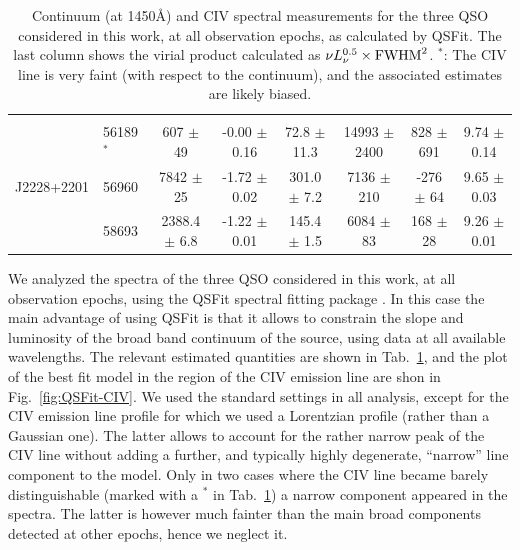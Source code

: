 \documentclass{article}
\begin{document}
\begin{table}
\begin{centering}
\begin{tabular}{l | l | c c | c c c | c}
                                      &                        &                                     &                          &                    &                     &                  \\
                       &  56189$^*$   &    607   $\pm$ 49      &  -0.00 $\pm$ 0.16                   &   72.8  $\pm$ 11.3       &  14993 $\pm$ 2400  &     828 $\pm$ 691   &   9.74 $\pm$ 0.14\\  
          J2228+2201   &  56960       &   7842   $\pm$ 25      &  -1.72 $\pm$ 0.02                   &  301.0  $\pm$  7.2       &   7136 $\pm$  210  &    -276 $\pm$  64   &   9.65 $\pm$ 0.03\\ 
                       &  58693       &   2388.4 $\pm$  6.8    &  -1.22 $\pm$ 0.01                   &  145.4  $\pm$  1.5       &   6084 $\pm$   83  &     168 $\pm$  28   &   9.26 $\pm$ 0.01\\  
      \hline
      \hline
    \end{tabular}
    \caption{Continuum (at 1450\AA) and CIV spectral measurements for the three QSO considered in this work, at all observation epochs, as calculated by QSFit.  The last column shows the virial product calculated as $\nu L_{\nu}^{0.5} \times {\rm FWHM}^2$.  $^*$: The CIV line is very faint (with respect to the continuum), and the associated estimates are likely biased.}
    \label{tab:QSFit-results}
  \end{centering}
\end{table}

We analyzed the spectra of the three QSO considered in this work, at all observation epochs, using the QSFit spectral fitting package \citep{Calderone2017}.  In this case the main advantage of using QSFit is that it allows to constrain the slope and luminosity of the broad band continuum of the source, using data at all available wavelengths. The relevant estimated quantities are shown in Tab.~\ref{tab:QSFit-results}, and the plot of the best fit model in the region of the CIV emission line are shon in Fig.~\ref{fig:QSFit-CIV}.  We used the standard settings in all analysis, except for the CIV emission line profile for which we used a Lorentzian profile (rather than a Gaussian one).  The latter allows to account for the rather narrow peak of the CIV line without adding a further, and typically highly degenerate, ``narrow'' line component to the model.  Only in two cases where the CIV line became barely distinguishable (marked with a $^*$ in Tab.~\ref{tab:QSFit-results}) a narrow component appeared in the spectra.  The latter is however much fainter than the main broad components detected at other epochs, hence we neglect it.
\end{document}
